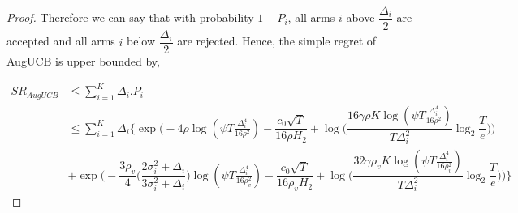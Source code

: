 \begin{proof}
Therefore we can say that with probability $1-P_{i}$, all arms $i$ above $\dfrac{\Delta_{i}}{2}$ are accepted and all arms $i$ below $\dfrac{\Delta_{i}}{2}$ are rejected. Hence, the simple regret of AugUCB is upper bounded by,

\begin{align*}
SR_{AugUCB} &\leq \sum_{i=1}^{K} \Delta_{i}. P_{i}\\
& \leq \sum_{i=1}^{K} \Delta_{i}\bigg\lbrace \exp\bigg(-4\rho\log (\psi T\frac{\Delta_{i}^{4}}{16\rho^{2}})-\dfrac{c_{0}\sqrt{T}}{16\rho H_{2}} + \log \big( \dfrac{16\gamma\rho K\log (\psi T \frac{\Delta_{i}^{4}}{16\rho^{2}})}{T\Delta_{i}^{2}}\log_{2}\dfrac{T}{e} \big) \bigg) \\
& + \exp\bigg(- \dfrac{3\rho_v}{4} \bigg(\dfrac{2\sigma_{i}^{2}+\Delta_{i}}{3\sigma_{i}^{2}+\Delta_{i}}\bigg)\log(\psi T\frac{\Delta_{i}^{4}}{16\rho_{v}^{2}}) -\dfrac{c_{0}\sqrt{T}}{16\rho_v H_{2}} + \log\big ( \dfrac{32\gamma\rho_v K\log (\psi T \frac{\Delta_{i}^{4}}{16\rho_{v}^{2}})}{T\Delta_{i}^{2}}\log_{2}\dfrac{T}{e} \big)  \bigg)\bigg\rbrace
\end{align*}

%
%
%
%
%
%
%
%
%
%

\end{proof}

